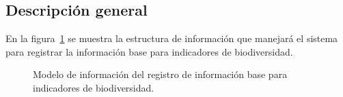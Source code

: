 \subsection{Descripción general}
 En la figura~\ref{fig:registroInfoBaseBiodiversidad} se muestra la estructura de información que manejará el sistema para registrar la información base para indicadores de biodiversidad.
 
\begin{figure}[htbp!]
	\begin{center}
		\caption{Modelo de información del registro de información base para indicadores de biodiversidad.}
		\label{fig:registroInfoBaseBiodiversidad}
	\end{center}
\end{figure}

